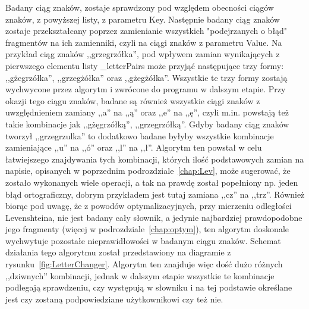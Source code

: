 \lssetdef


Badany ciąg znaków, zostaje sprawdzony pod względem obecności ciągów znaków, z powyższej listy, z parametru Key. Następnie badany ciąg znaków zostaje przekształcany poprzez zamienianie wszystkich "podejrzanych o błąd" fragmentów na ich zamienniki, czyli na ciągi znaków z parametru Value. Na przykład ciąg znaków ,,grzegrzółka'', pod wpływem zamian wynikających z pierwszego elementu listy \_letterPairs może przyjąć następujące trzy formy: ,,gżegrzółka'', ,,grzegżółka'' oraz ,,gżegżółka''. Wszystkie te trzy formy zostają wychwycone przez algorytm i zwrócone do programu w dalszym etapie. Przy okazji tego ciągu znaków, badane są również wszystkie ciągi znaków z uwzględnieniem zamiany ,,a'' na ,,ą'' oraz ,,e'' na ,,ę'', czyli m.in. powstają też takie kombinacje jak ,,gżęgrzółką'', ,,grzegrzółką''.  Gdyby badany ciąg znaków tworzył ,,grzegrzulka'' to dodatkowo badane byłyby wszystkie kombinacje zamieniające ,,u'' na ,,ó'' oraz ,,l'' na ,,ł''. Algorytm ten powstał w celu łatwiejszego znajdywania tych kombinacji, których ilość podstawowych zamian na napisie, opisanych w poprzednim podrozdziale~\ref{chap:Lev}, może sugerować, że zostało wykonanych wiele operacji, a tak na prawdę został popełniony np. jeden błąd ortograficzny, dobrym przykładem jest tutaj zamiana ,,cz'' na ,,trz''. Również biorąc pod uwagę, że z powodów optymalizacyjnych, przy mierzeniu odległości Levenshteina, nie jest badany cały słownik, a jedynie najbardziej prawdopodobne jego fragmenty (więcej w podrozdziale~\ref{chap:optym}), ten algorytm doskonale wychwytuje pozostałe nieprawidłowości w badanym ciągu znaków. Schemat działania tego algorytmu został przedstawiony na diagramie z rysunku~\ref{fig:LetterChanger}. Algorytm ten znajduje więc dość dużo różnych ,,dziwnych'' kombinacji, jednak w dalszym etapie wszystkie te kombinacje podlegają sprawdzeniu, czy występują w słowniku i na tej podstawie określane jest czy zostaną podpowiedziane użytkownikowi czy też nie.

